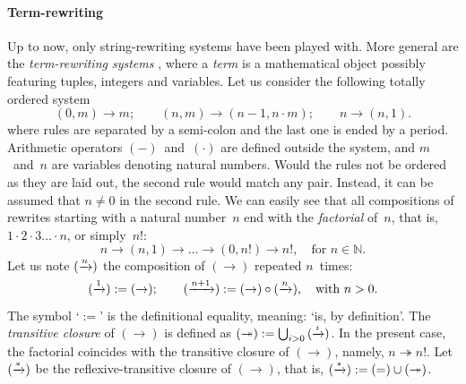 \paragraph{Term-rewriting}

Up to now, only string\hyp{}rewriting systems have been played
with. More general are the \emph{term\hyp{}rewriting
  systems} \citep{BaaderNipkow_1998}, where a
\emph{term} is a mathematical object possibly featuring
tuples, integers and variables. Let us consider the following totally
ordered system
\begin{equation}
(0,m) \rightarrow m;\qquad
(n,m) \rightarrow (n-1,n \cdot m);\qquad
n     \rightarrow (n,1).
\label{eq:fact_tf}
\end{equation}
where rules are separated by a semi\hyp{}colon and the last one is
ended by a period. Arithmetic operators \((-)\)~and~\((\cdot)\) are
defined outside the system, and \(m\)~and~\(n\) are variables denoting
natural numbers. Would the rules not be ordered as they are laid out,
the second rule would match any pair. Instead, it can be assumed that
\(n \neq 0\) in the second rule. We can easily see that all
compositions of rewrites starting with a natural number~\(n\) end with
the \emph{factorial} of~\(n\), that is, \(1 \cdot 2
\cdot 3 \dots \cdot n\), or simply~\(n!\):
\begin{equation*}
n \rightarrow (n,1) \rightarrow \dots \rightarrow (0,n!) \rightarrow
n!, \quad \text{for \(n \in \mathbb{N}\)}.
\end{equation*}
Let us note \((\xrightarrow{\smash{n}})\) the composition of
\((\rightarrow)\) repeated \(n\)~times:
\begin{equation*}
  (\xrightarrow{\smash{1}})   := (\rightarrow);\qquad
  (\xrightarrow{\smash{n+1}}) :=
     (\rightarrow) \circ (\xrightarrow{\smash{n}}),
\quad \text{with \(n > 0\)}.
\end{equation*}
The symbol `\(:=\)' is the definitional equality, meaning: `is, by
definition'. The \emph{transitive closure} \label{transitive_closure} of \((\rightarrow)\) is defined
as \((\twoheadrightarrow) := \bigcup_{i >
  0}{(\xrightarrow{\smash{i}})}\). In the present case, the
factorial coincides with the transitive closure of
\((\rightarrow)\), namely, \(n \twoheadrightarrow n!\). Let
\((\xrightarrow{\smash{*}})\) be the reflexive\hyp{}transitive closure
of \((\rightarrow)\), that is, \((\xrightarrow{\smash{*}}) := (=) \cup
(\twoheadrightarrow)\).

